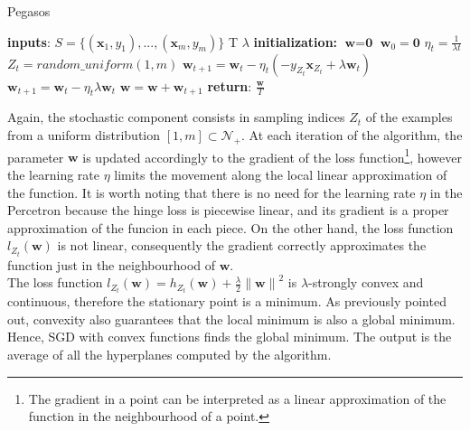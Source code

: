 \documentclass{article}
\begin{document}
\begin{algorithm} [H]
   \caption{Pegasos}  \label{pegasos algorithm}
    \begin{algorithmic}[1]
        \State \textbf{inputs}: 
        \State  $ S = \{(\textbf{x}_1,y_1), ..., (\textbf{x}_m,y_m) \}$  
        \State T 
        \State $\lambda$
        \State \textbf{initialization:} 
        \State $\textbf{w} = \textbf{0}$ 
        \State $\textbf{w}_0 = \textbf{0}$ 
 		\State $\eta_t = \frac{1}{\lambda t}$    
 			\State $Z_t = random\_uniform(1,m)$ 
 				\State $\textbf{w}_{t+1} = \textbf{w}_t - \eta_t(-y_{Z_t} \textbf{x}_{Z_t} + \lambda\textbf{w}_t)$
 			\Else
 				\State $\textbf{w}_{t+1} = \textbf{w}_t - \eta_t\lambda\textbf{w}_t$
 			\EndIf
 		\State $\textbf{w} = \textbf{w} + \textbf{w}_{t+1}$
 		\EndFor
 \State \textbf{return}:  $\frac{\textbf{w}}{T}$
\end{algorithmic}
\end{algorithm}
\noindent Again, the stochastic component consists in sampling indices  $Z_t$ of the examples from a uniform distribution $[1,m] \subset  \mathcal{N_+}$.
At each iteration of the algorithm, the parameter $\textbf{w}$ is updated accordingly to the gradient of the loss function\footnote{The gradient in a point can be interpreted as a linear approximation of the function in the neighbourhood of a point.}, however the learning rate $\eta$ limits the movement along the local linear approximation of the function. It is worth noting that there is no need for the learning rate $\eta$ in the Percetron because the hinge loss is piecewise linear, and its gradient is a proper approximation of the funcion in each piece. On the other hand, the loss function $l_{Z_t}(\textbf{w})$ is not linear, consequently the gradient correctly approximates the function just in the neighbourhood of $\textbf{w}$. \\
The loss function $ l_{Z_t}(\textbf{w}) = h_{Z_t}(\textbf{w}) + \frac{\lambda}{2} {\lVert \textbf{w} \rVert}^2$ is $\lambda$-strongly convex and continuous, therefore the stationary point is a minimum. As previously pointed out, convexity also guarantees that the local minimum is also a global minimum. Hence, SGD with convex functions finds the global minimum.
The output is the average of all the hyperplanes computed by the algorithm.
\end{document}
